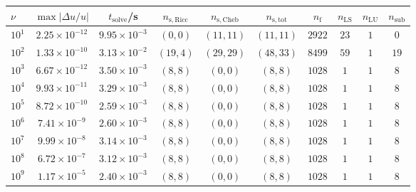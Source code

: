 \begin{tabular}{l c c c c c c c c c}
\hline \hline 
$\nu$  &  $\max|\Delta u/u|$  &  $t_{\mathrm{solve}}$/\si{\s}  &  $n_{\mathrm{s,Ricc}}$  &  $n_{\mathrm{s,Cheb}}$  &  $n_{\mathrm{s,tot}}$  &  $n_{\mathrm{f}}$  &  $n_{\mathrm{LS}}$  &  $n_{\mathrm{LU}}$  &  $n_{\mathrm{sub}}$ \\ \hline
    $10^1$  &  $2.25 \times 10^{-12}$  &  $9.95\times 10^{-3}$    &  $(0, 0)$  &  $(11, 11)$  &  $(11, 11)$  &  $2922$  &  $23$  &  $1$  &  $0$\\ 
    $10^2$  &  $1.33 \times 10^{-10}$  &  $3.13\times 10^{-2}$    &  $(19, 4)$  &  $(29, 29)$  &  $(48, 33)$  &  $8499$  &  $59$  &  $1$  &  $19$\\ 
    $10^3$  &  $6.67 \times 10^{-12}$  &  $3.50\times 10^{-3}$    &  $(8, 8)$  &  $(0, 0)$  &  $(8, 8)$  &  $1028$  &  $1$  &  $1$  &  $8$\\ 
    $10^4$  &  $9.93 \times 10^{-11}$  &  $3.29\times 10^{-3}$    &  $(8, 8)$  &  $(0, 0)$  &  $(8, 8)$  &  $1028$  &  $1$  &  $1$  &  $8$\\ 
    $10^5$  &  $8.72 \times 10^{-10}$  &  $2.59\times 10^{-3}$    &  $(8, 8)$  &  $(0, 0)$  &  $(8, 8)$  &  $1028$  &  $1$  &  $1$  &  $8$\\ 
    $10^6$  &  $7.41 \times 10^{-9}$  &  $2.60\times 10^{-3}$    &  $(8, 8)$  &  $(0, 0)$  &  $(8, 8)$  &  $1028$  &  $1$  &  $1$  &  $8$\\ 
    $10^7$  &  $9.99 \times 10^{-8}$  &  $3.14\times 10^{-3}$    &  $(8, 8)$  &  $(0, 0)$  &  $(8, 8)$  &  $1028$  &  $1$  &  $1$  &  $8$\\ 
    $10^8$  &  $6.72 \times 10^{-7}$  &  $3.12\times 10^{-3}$    &  $(8, 8)$  &  $(0, 0)$  &  $(8, 8)$  &  $1028$  &  $1$  &  $1$  &  $8$\\ 
    $10^9$  &  $1.17 \times 10^{-5}$  &  $2.40\times 10^{-3}$    &  $(8, 8)$  &  $(0, 0)$  &  $(8, 8)$  &  $1028$  &  $1$  &  $1$  &  $8$\\ 
\hline \hline
\end{tabular}
